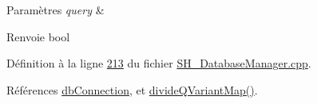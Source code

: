 \begin{DoxyParams}{Paramètres}
{\em query} & \\
\hline
\end{DoxyParams}
\begin{DoxyReturn}{Renvoie}
bool 
\end{DoxyReturn}


Définition à la ligne \hyperlink{SH__DatabaseManager_8cpp_source_l00213}{213} du fichier \hyperlink{SH__DatabaseManager_8cpp_source}{S\-H\-\_\-\-Database\-Manager.\-cpp}.



Références \hyperlink{classSimpleHotel_1_1SH__DatabaseManager_a01130ad218e0a00e80f53c4894996d19}{db\-Connection}, et \hyperlink{classSimpleHotel_1_1SH__DatabaseManager_a35a879c68dc40e386ff536e97ae2733d}{divide\-Q\-Variant\-Map()}.



